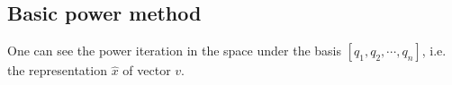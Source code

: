 \subsection{Basic power method}
One can see the power iteration in the space under the basis $[q_1,q_{2}, \cdots,  q_{n}]$, i.e. the representation $\hat{x}$ of vector $v$. 